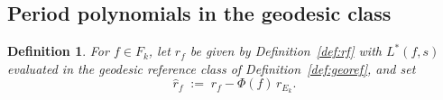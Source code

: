 \documentclass[11pt]{article}
\newtheorem{definition}[theorem]{Definition}
\begin{document}

\subsection{Period polynomials in the geodesic class}\label{sec:arcperiod}


\begin{definition}\label{def:rfhat}
For $f\in F_k$, let $r_f$ be given by Definition~\ref{def:rf} with $L^*(f,s)$ evaluated in the
geodesic reference class of Definition~\ref{def:georef}, and set
\begin{equation}\label{eq:rfhat}
\hat r_f\;:=\;r_f-\Phi(f)\,r_{E_k}.
\end{equation}
\end{definition}
\end{document}
